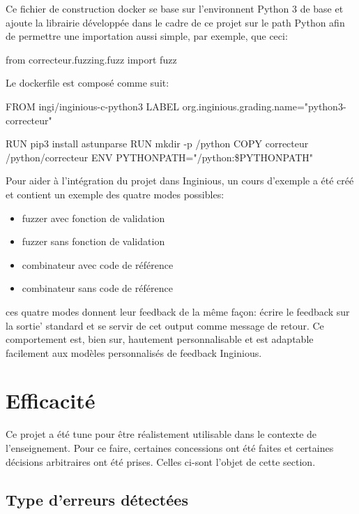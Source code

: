 \documentclass[a4paper]{report}
\begin{document}
Ce fichier de construction docker se base sur l'environnent Python 3 de base et ajoute la librairie développée dans le cadre de ce projet sur le path Python afin de permettre une importation aussi simple, par exemple, que ceci:

\begin{python}
from correcteur.fuzzing.fuzz import fuzz
\end{python}

Le dockerfile est composé comme suit:
\begin{python}
FROM ingi/inginious-c-python3
LABEL org.inginious.grading.name="python3-correcteur"


RUN pip3 install astunparse
RUN mkdir -p /python
COPY correcteur /python/correcteur
ENV PYTHONPATH="/python:\${PYTHONPATH}"
\end{python}


Pour aider à l'intégration du projet dans Inginious, un cours d'exemple a été créé et contient un exemple des quatre modes possibles:
\begin{itemize}
\item fuzzer avec fonction de validation
\item fuzzer sans fonction de validation
\item combinateur avec code de référence
\item combinateur sans code de référence
\end{itemize}
ces quatre modes donnent leur feedback de la même façon: écrire le feedback sur la sortie' standard et se servir de cet output comme message de retour.
Ce comportement est, bien sur, hautement personnalisable et est adaptable facilement aux modèles personnalisés de feedback Inginious.

\section{Efficacité}

Ce projet a été tune pour être réalistement utilisable dans le contexte de l'enseignement.
Pour ce faire, certaines concessions  ont été faites et certaines décisions arbitraires ont été prises.
Celles ci-sont l'objet de cette section.

\subsection{Type d'erreurs détectées}

\end{document}
